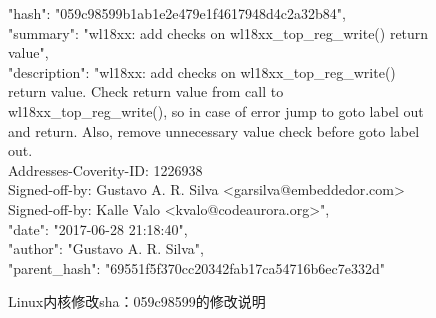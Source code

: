 \begin{figure}[t]
	\centering
	\begin{minipage}{0.75\linewidth}
{\footnotesize	
"hash": "059c98599b1ab1e2e479e1f4617948d4c2a32b84",\\
"summary": "wl18xx: add checks on wl18xx\_top\_reg\_write() return value",\\
"description": 
"wl18xx: add checks on wl18xx\_top\_reg\_write() return value.
Check return value from call to wl18xx\_top\_reg\_write(),
so in case of error jump to goto label out and return.
Also, remove unnecessary value check before goto label out.\\
Addresses-Coverity-ID: 1226938\\
Signed-off-by: Gustavo A. R. Silva <garsilva@embeddedor.com>\\
Signed-off-by: Kalle Valo <kvalo@codeaurora.org>",\\
"date": "2017-06-28 21:18:40",\\
"author": "Gustavo A. R. Silva",\\
"parent\_hash": "69551f5f370cc20342fab17ca54716b6ec7e332d"	
}
	\end{minipage}
	\caption{
	Linux内核修改sha：059c98599的修改说明
	}
	\label{fig:2-3-description}
\end{figure}